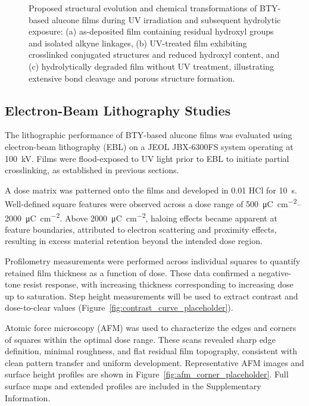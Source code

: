\begin{figure}[ht]
  \centering
  \begin{center}
  \end{center}
  \caption{Proposed structural evolution and chemical transformations of BTY-based alucone films during UV irradiation and subsequent hydrolytic exposure: (a) as-deposited film containing residual hydroxyl groups and isolated alkyne linkages, (b) UV-treated film exhibiting crosslinked conjugated structures and reduced hydroxyl content, and (c) hydrolytically degraded film without UV treatment, illustrating extensive bond cleavage and porous structure formation.}
  \label{fig:structure_evolution}
\end{figure}


\subsection{Electron-Beam Lithography Studies}

The lithographic performance of BTY-based alucone films was evaluated using electron-beam lithography (EBL) on a JEOL JBX-6300FS system operating at \SI{100}{\kilo\volt}. Films were flood-exposed to UV light prior to EBL to initiate partial crosslinking, as established in previous sections.

A dose matrix was patterned onto the films and developed in \SI{0.01}{\molar} HCl for \SI{10}{\second}. Well-defined square features were observed across a dose range of \SIrange{500}{2000}{\micro\coulomb\per\centi\meter\squared}. Above \SI{2000}{\micro\coulomb\per\centi\meter\squared}, haloing effects became apparent at feature boundaries, attributed to electron scattering and proximity effects, resulting in excess material retention beyond the intended dose region.

Profilometry measurements were performed across individual squares to quantify retained film thickness as a function of dose. These data confirmed a negative-tone resist response, with increasing thickness corresponding to increasing dose up to saturation. Step height measurements will be used to extract contrast and dose-to-clear values (Figure~\ref{fig:contrast_curve_placeholder}).

Atomic force microscopy (AFM) was used to characterize the edges and corners of squares within the optimal dose range. These scans revealed sharp edge definition, minimal roughness, and flat residual film topography, consistent with clean pattern transfer and uniform development. Representative AFM images and surface height profiles are shown in Figure~\ref{fig:afm_corner_placeholder}. Full surface maps and extended profiles are included in the Supplementary Information.


